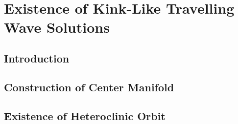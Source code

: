 \chapter{Existence of Kink-Like Travelling Wave Solutions}
\label{chp:existence}
\pagestyle{myheadings}

\section{Introduction}




\section{Construction of Center Manifold}





\section{Existence of Heteroclinic Orbit}





%